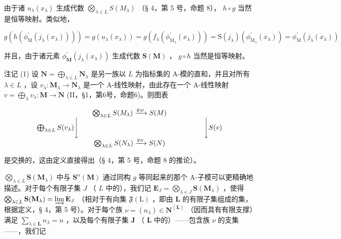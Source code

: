由于诸 \(u_{\lambda}(x_{\lambda})\) 生成代数 \(\bigotimes_{\lambda \in L} S(M_{\lambda})\) （§ 4，第 5 号，命题 8）， \(h \circ g\) 当然是恒等映射。类似地，

\[
g \left(h \left(\phi_ {\mathrm{M}} ^ {\prime} \left(j _ {\lambda} \left(x _ {\lambda}\right)\right)\right)\right) = g \left(u _ {\lambda} \left(x _ {\lambda}\right)\right) = g \left(f _ {\lambda} \left(\phi_ {\mathrm{M} _ {\lambda}} ^ {\prime} \left(x _ {\lambda}\right)\right)\right) = \mathrm{S} \left(j _ {\lambda}\right) \left(\phi_ {\mathrm{M} _ {\lambda}} ^ {\prime} \left(x _ {\lambda}\right)\right) = \phi_ {\mathrm{M}} ^ {\prime} \left(j _ {\lambda} \left(x _ {\lambda}\right)\right)
\]

并且，由于诸元素 \(\phi_{\mathbf{M}}^{\prime}(j_{\lambda}(x_{\lambda}))\) 生成代数 \(\mathbf{S}(\mathbf{M})\) ， \(g \circ h\) 当然是恒等映射。

注记 (1) 设 \(\mathbf{N} = \bigoplus_{\lambda \in L} \mathbf{N}_{\lambda}\) 是另一族以 \(L\) 为指标集的 A-模的直和，并且对所有 \(\lambda \in L\) ，设 \(v_{\lambda}: \mathbf{M}_{\lambda} \to \mathbf{N}_{\lambda}\) 是一个 A-线性映射，由此存在一个 A-线性映射 \(v = \bigoplus_{\lambda} v_{\lambda}: \mathbf{M} \to \mathbf{N}\) (II，§1，第6号，命题6)。则图表

\[
\begin{array}{c} \bigotimes_ {\lambda \in L} S (M _ {\lambda}) \xrightarrow {g _ {M}} S (M) \\ \bigoplus_ {\lambda \in L} S (v _ {\lambda}) \Biggl \downarrow \qquad \qquad \qquad \qquad \qquad \qquad \qquad \qquad \qquad \Biggl \downarrow S (v) \\ \bigotimes_ {\lambda \in L} S (N _ {\lambda}) \xrightarrow {g _ {N}} S (N) \end{array}
\]

是交换的，这由定义直接得出（§ 4，第 5 号，命题 8 的推论）。

\(\bigotimes_{\lambda \in L} \mathbf{S}(\mathbf{M}_{\lambda})\) 中与 \(\mathbf{S}^n(\mathbf{M})\) 通过同构 \(g\) 等同起来的那个 A-子模可以更精确地描述。对于每个有限子集 \(J\) （ \(L\) 中的），我们记 \(\mathbf{E}_J = \bigotimes_{\lambda \in J} \mathbf{S}(\mathbf{M}_{\lambda})\) ，使得 \(\bigotimes_{\lambda \in L} \mathbf{S}(\mathbf{M}_{\lambda}) = \varinjlim \mathbf{E}_J\) （相对于有向集 \(\mathfrak{F}(\mathrm{L})\) ，即由 \(\mathbf{L}\) 的有限子集组成的集，根据定义，§ 4，第 5 号）。对于每个族 \(\nu = (n_{\lambda}) \in \mathbf{N}^{(\mathbf{L})}\) （因而具有有限支撑）满足 \(\sum_{\lambda \in \mathbf{L}} n_{\lambda} = n\) ，以及每个有限子集 \(\mathbf{J}\) （ \(\mathbf{L}\) 中的）——包含族 \(\nu\) 的支集——，我们记

